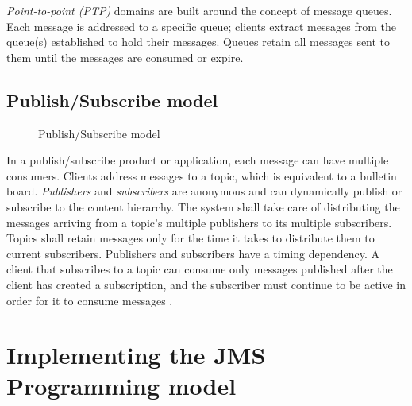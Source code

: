 \documentclass[9pt,twocolumn,twoside]{../../styles/osajnl}
\begin{document}
\emph{Point-to-point (PTP)} domains are built around the concept of
message queues.  Each message is addressed to a specific queue;
clients extract messages from the queue(s) established to hold their
messages. Queues retain all messages sent to them until the messages
are consumed or expire.

\subsection{Publish/Subscribe model}

\begin{figure}[htbp]
\centering
{}
\caption{Publish/Subscribe model \cite{www-jms-tutorialoracle}}
\label{fig: Publish/Subscribe messaging}
\end{figure}

In a publish/subscribe product or application, each message can have
multiple consumers. Clients address messages to a topic, which is
equivalent to a bulletin board. \emph{Publishers} and
\emph{subscribers} are anonymous and can dynamically publish or
subscribe to the content hierarchy. The system shall take care of
distributing the messages arriving from a topic’s multiple publishers
to its multiple subscribers. Topics shall retain messages only for the
time it takes to distribute them to current subscribers.  Publishers
and subscribers have a timing dependency. A client that subscribes to
a topic can consume only messages published after the client has
created a subscription, and the subscriber must continue to be active
in order for it to consume messages \cite{www-jms-tutorialoracle}.


\section{Implementing the JMS Programming model}
\end{document}
